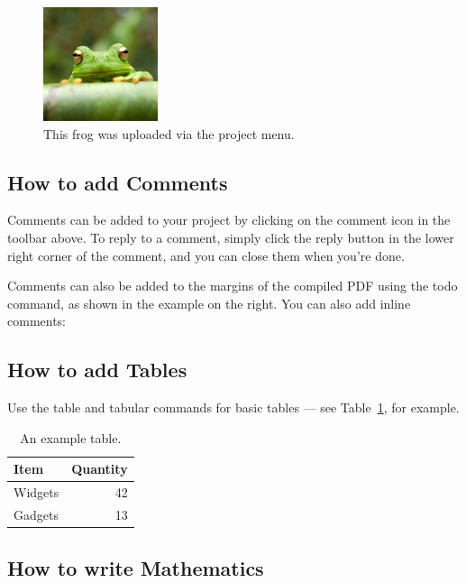 \documentclass[a4paper]{article}
\begin{document}
\begin{figure}
\centering
\includegraphics[width=0.3\textwidth]{frog.jpg}
\caption{\label{fig:frog}This frog was uploaded via the project menu.}
\end{figure}

\subsection{How to add Comments}

Comments can be added to your project by clicking on the comment icon in the toolbar above. %
%
%
To reply to a comment, simply click the reply button in the lower right corner of the comment, and you can close them when you're done.

Comments can also be added to the margins of the compiled PDF using the todo command,  as shown in the example on the right. You can also add inline comments:


\subsection{How to add Tables}

Use the table and tabular commands for basic tables --- see Table~\ref{tab:widgets}, for example. 

\begin{table}
\centering
\begin{tabular}{l|r}
Item & Quantity \\\hline
Widgets & 42 \\
Gadgets & 13
\end{tabular}
\caption{\label{tab:widgets}An example table.}
\end{table}

\subsection{How to write Mathematics}
\end{document}
